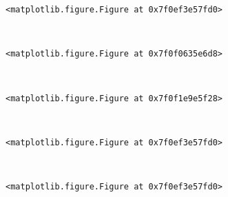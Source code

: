 \documentclass[11pt]{article}
\begin{document}
    
    \begin{verbatim}
<matplotlib.figure.Figure at 0x7f0ef3e57fd0>
    \end{verbatim}

    
    \begin{center}
    \end{center}
    { \hspace*{\fill} \\}
    
    
    \begin{verbatim}
<matplotlib.figure.Figure at 0x7f0f0635e6d8>
    \end{verbatim}

    
    \begin{center}
    \end{center}
    { \hspace*{\fill} \\}
    
    
    \begin{verbatim}
<matplotlib.figure.Figure at 0x7f0f1e9e5f28>
    \end{verbatim}

    
    \begin{center}
    \end{center}
    { \hspace*{\fill} \\}
    
    
    \begin{verbatim}
<matplotlib.figure.Figure at 0x7f0ef3e57fd0>
    \end{verbatim}

    
    \begin{center}
    \end{center}
    { \hspace*{\fill} \\}
    
    
    \begin{verbatim}
<matplotlib.figure.Figure at 0x7f0ef3e57fd0>
    \end{verbatim}

    
    \begin{center}
    \end{center}
    { \hspace*{\fill} \\}
    
\end{document}
